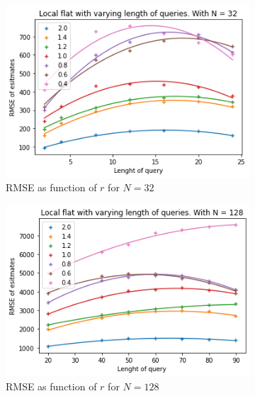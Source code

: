 \documentclass[11pt]{article}
\theoremstyle{definition}
\begin{document}
\begin{figure}[H]
\centering
\begin{subfigure}{.4\textwidth}
  \centering
  \includegraphics[width=\linewidth]{figures/local_flat/varying_r/loc_flat_varying_length_N_poly_=32.png}
  \caption{RMSE as function of $r$ for $N=32$}
  \label{fig:a}
\end{subfigure}%
\begin{subfigure}{.4\textwidth}
  \centering
  \includegraphics[width=\linewidth]{figures/local_flat/varying_r/loc_flat_varying_length_N_poly_=128.png}
  \caption{RMSE as function of $r$ for $N=128$}
  \label{fig:a}
\end{subfigure}
\begin{subfigure}{.4\textwidth}
  \centering

\end{subfigure}
\end{figure}
\end{document}
